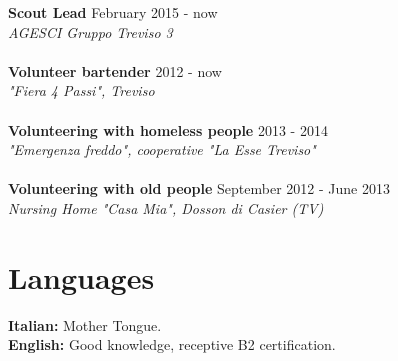 \documentclass[margin, 10pt]{res}
\begin{document}
\begin{resume}
\textbf{Scout Lead} \hfill February 2015 - now \\
\textit{AGESCI Gruppo Treviso 3} \\ \\
\textbf{Volunteer bartender} \hfill 2012 - now \\
\textit{"Fiera 4 Passi", Treviso} \\ \\
\textbf{Volunteering with homeless people} \hfill 2013 - 2014 \\
\textit{"Emergenza freddo", cooperative "La Esse Treviso"} \\ \\
\textbf{Volunteering with old people} \hfill September 2012 - June 2013 \\
\textit{Nursing Home "Casa Mia", Dosson di Casier (TV)} 



\section{Languages}
\textbf{Italian: } Mother Tongue. \\
\textbf{English: } Good knowledge, receptive B2 certification.\\

\end{resume}
\end{document}
